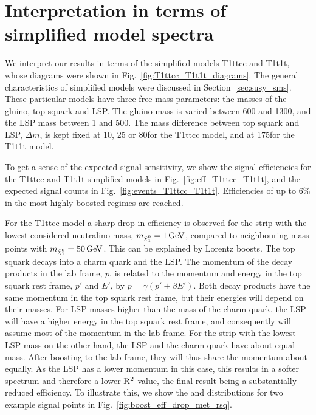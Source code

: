 \section{Interpretation in terms of simplified model spectra \label{sec:boost_interpretation}}

We interpret our results in terms of the simplified models T1ttcc and T1t1t, whose
diagrams were shown in Fig.~\ref{fig:T1ttcc_T1t1t_diagrams}. The general characteristics of
simplified models were discussed in Section~\ref{sec:susy_sms}. These particular models have three
free mass parameters: the masses of the gluino, top squark and LSP. The gluino mass is varied
between
600 and 1300\GeV, and the LSP mass between 1 and 500\GeV. The mass difference between top squark and
LSP, $\Delta m$, is kept fixed at 10, 25 or 80\GeV for the T1ttcc model, and at 175\GeV for the
T1t1t model. 

To get a sense of the expected signal sensitivity, we show the signal efficiencies for the T1ttcc
and T1t1t simplified models in Fig.~\ref{fig:eff_T1ttcc_T1t1t}, and the expected signal counts in
Fig.~\ref{fig:events_T1ttcc_T1t1t}. 
Efficiencies of up to 6\% in the most highly boosted regimes are reached. 

For the T1ttcc model a sharp drop in efficiency is observed for the strip with the lowest considered
neutralino mass, $m_{\tilde{\chi}_1^0} = 1\,\text{Ge\hspace{-.08em}V}$, compared to neighbouring mass points with $m_{\tilde{\chi}_1^0} = 50\,\text{Ge\hspace{-.08em}V}$.
This can be explained by Lorentz boosts. The top squark decays into a charm quark and the LSP. The
momentum of the decay products in the lab frame, $p$, is related to the momentum and energy in the
top squark rest frame, $p'$ and $E'$, by $p = \gamma (p' + \beta E')$. Both decay products have the
same momentum in the top squark rest frame, but their energies will depend on their masses. 
For LSP masses higher than the mass of the charm quark, the LSP will have a higher energy
in the top squark rest frame, and consequently will assume most of the momentum in the lab frame.
For the strip with the lowest LSP mass on the other hand, the LSP and the charm quark have
about equal mass. After boosting to the lab frame, they will thus share the momentum about equally.
As the LSP has a lower momentum in this case, this results in a softer \ETm spectrum and therefore a
lower $\mathrm{R^2}$ value, the final result being a substantially reduced efficiency. To illustrate
this, we show the \ETm and \rsq distributions for two example signal points in
Fig.~\ref{fig:boost_eff_drop_met_rsq}.

